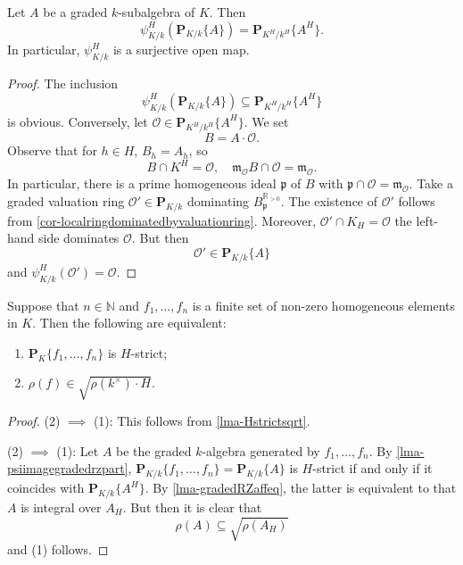 \begin{lemma}\label{lma-psiimagegradedrzpart}
    Let $A$ be a graded $k$-subalgebra of $K$. Then 
    \[
        \psi_{K/k}^H\left( \mathbf{P}_{K/k}\{A\} \right)=  \mathbf{P}_{K^H/k^H}\{A^H\}.
    \]
    In particular, $\psi_{K/k}^H$ is a surjective open map.
\end{lemma}
\begin{proof}
    The inclusion 
    \[
        \psi_{K/k}^H\left( \mathbf{P}_{K/k}\{A\} \right)\subseteq \mathbf{P}_{K^H/k^H}\{A^H\}
    \]    
    is obvious. Conversely, let $\mathcal{O}\in \mathbf{P}_{K^H/k^H}\{A^H\}$. We set
    \[
        B=A\cdot \mathcal{O}.  
    \]
    Observe that for $h\in H$, $B_h=A_h$, so
    \[
        B\cap K^H=\mathcal{O},\quad \mathfrak{m}_{\mathcal{O}}B\cap \mathcal{O}=\mathfrak{m}_{\mathcal{O}}.  
    \]
    In particular, there is a prime homogeneous ideal $\mathfrak{p}$ of $B$ with $\mathfrak{p}\cap \mathcal{O}=\mathfrak{m}_{\mathcal{O}}$. Take a graded valuation ring $\mathcal{O}'\in \mathbf{P}_{K/k}$ dominating $B_{\mathfrak{p}}^{\mathbb{R}_{>0}}$. The existence of $\mathcal{O}'$ follows from \cref{cor-localringdominatedbyvaluationring}. Moreover, $\mathcal{O}'\cap K_H=\mathcal{O}$ the left-hand side dominates $\mathcal{O}$. But then
    \[
        \mathcal{O}'\in   \mathbf{P}_{K/k}\{A\} 
    \]
    and $\psi_{K/k}^H(\mathcal{O}')=\mathcal{O}$.
\end{proof}


\begin{corollary}\label{cor-affinesetsHstrictcri}
    Suppose that $n\in \mathbb{N}$ and $f_1,\ldots,f_n$ is a finite set of non-zero homogeneous elements in $K$. 
    Then the following are equivalent:
    \begin{enumerate}
        \item $\mathbf{P}_K\{f_1,\ldots,f_n\}$ is $H$-strict;
        \item $\rho(f)\in \sqrt{\rho(k^{\times})\cdot H}$.
    \end{enumerate}
\end{corollary}
\begin{proof}
    (2) $\implies$ (1): This follows from \cref{lma-Hstrictsqrt}.

    (2) $\implies$ (1):
    Let $A$ be the graded $k$-algebra generated by $f_1,\ldots,f_n$.
    By \cref{lma-psiimagegradedrzpart}, $\mathbf{P}_{K/k}\{f_1,\ldots,f_n\}=\mathbf{P}_{K/k}\{A\}$ is $H$-strict if and only if it coincides with $\mathbf{P}_{K/k}\{A^H\}$. By \cref{lma-gradedRZaffeq}, the latter is equivalent to that $A$ is integral over $A_H$. But then it is clear that 
    \[
        \rho(A)\subseteq \sqrt{\rho(A_H)}
    \]
    and (1) follows.
\end{proof}

